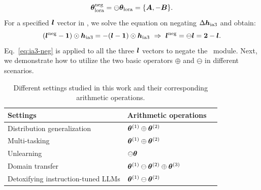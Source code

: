 \begin{equation}
{\bm{\theta}}_{\text{lora}}^{\text{neg}} = \ominus{\bm{\theta}}_{\text{lora}} = \{{\bm{A}}, -{\bm{B}}\}.
\end{equation}
For a specified ${\bm{l}}$ vector in \ia, we solve the equation on negating $\Delta {\bm{h}}_{\text{ia3}}$ and obtain:
\begin{equation}
\label{eq:ia3-neg}
    ({\bm{l}}^{\text{neg}} - \mathbf{1}) \odot {\bm{h}}_{\text{ia3}} = -({\bm{l}} - \mathbf{1}) \odot {\bm{h}}_{\text{ia3}} \ \Rightarrow \ {\bm{l}}^{\text{neg}} = \ominus {\bm{l}} = \mathbf{2}-{\bm{l}}.
\end{equation}
Eq.~\ref{eq:ia3-neg} is applied to all the three ${\bm{l}}$ vectors to negate the \ia~module. 
Next, we demonstrate how to utilize the two basic operators $\oplus$ and $\ominus$ in different scenarios.

\begin{table}[]
\centering
\caption{Different settings studied in this work and their corresponding arithmetic operations.}
\label{table:expls}
\begin{tabular}{lll}
\toprule
Settings & Arithmetic operations \\ \midrule
Distribution generalization & ${\bm{\theta}}^{(1)} \oplus {\bm{\theta}}^{(2)}$ \\
Multi-tasking & ${\bm{\theta}}^{(1)} \oplus {\bm{\theta}}^{(2)}$ \\
Unlearning & $\ominus {\bm{\theta}}$ \\
Domain transfer & ${\bm{\theta}}^{(1)} \ominus {\bm{\theta}}^{(2)} \oplus {\bm{\theta}}^{(3)}$ \\
Detoxifying instruction-tuned LLMs & ${\bm{\theta}}^{(1)} \ominus {\bm{\theta}}^{(2)}$ \\ 
\bottomrule
\end{tabular}
\end{table}


